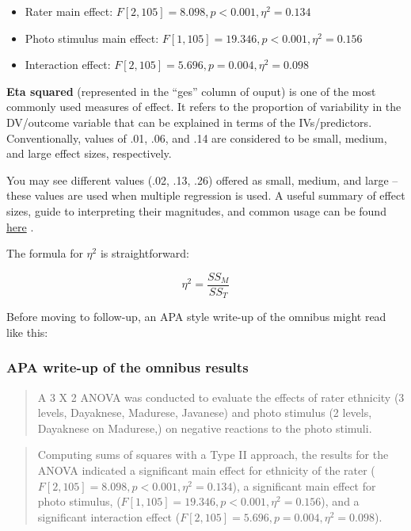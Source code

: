 \documentclass[
  11pt,
]{book}
\providecommand{\tightlist}{%
  \setlength{\itemsep}{0pt}\setlength{\parskip}{0pt}}
\begin{document}
\begin{itemize}
\tightlist
\item
  Rater main effect: \(F[2, 105] = 8.098, p < 0.001, \eta ^{2} = 0.134\)
\item
  Photo stimulus main effect: \(F[1, 105] = 19.346, p < 0.001, \eta ^{2} = 0.156\)
\item
  Interaction effect: \(F[2, 105] = 5.696, p = 0.004, \eta ^{2} = 0.098\)
\end{itemize}

\textbf{Eta squared} (represented in the ``ges'' column of ouput) is one of the most commonly used measures of effect. It refers to the proportion of variability in the DV/outcome variable that can be explained in terms of the IVs/predictors. Conventionally, values of .01, .06, and .14 are considered to be small, medium, and large effect sizes, respectively.

You may see different values (.02, .13, .26) offered as small, medium, and large -- these values are used when multiple regression is used. A useful summary of effect sizes, guide to interpreting their magnitudes, and common usage can be found \href{https://imaging.mrc-cbu.cam.ac.uk/statswiki/FAQ/effectSize}{here} \citep{watson_rules_2020}.

The formula for \(\eta ^{2}\) is straightforward:

\[\eta ^{2}=\frac{SS_{M}}{SS_{T}}\]

Before moving to follow-up, an APA style write-up of the omnibus might read like this:

\hypertarget{apa-write-up-of-the-omnibus-results}{%
\subsubsection{APA write-up of the omnibus results}\label{apa-write-up-of-the-omnibus-results}}

\begin{quote}
A 3 X 2 ANOVA was conducted to evaluate the effects of rater ethnicity (3 levels, Dayaknese, Madurese, Javanese) and photo stimulus (2 levels, Dayaknese on Madurese,) on negative reactions to the photo stimuli.
\end{quote}

\begin{quote}
Computing sums of squares with a Type II approach, the results for the ANOVA indicated a significant main effect for ethnicity of the rater (\(F[2, 105] = 8.098, p < 0.001, \eta ^{2} = 0.134\)), a significant main effect for photo stimulus, (\(F[1, 105] = 19.346, p < 0.001, \eta ^{2} = 0.156\)), and a significant interaction effect (\(F[2, 105] = 5.696, p = 0.004, \eta ^{2} = 0.098\)).
\end{quote}
\end{document}
